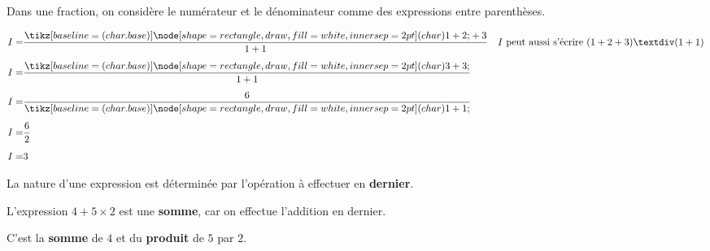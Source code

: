 \documentclass[../€Cours-complet/Cours-complet]{subfiles}
\begin{document}
\begin{cours}
	Dans une fraction, on considère le numérateur et le dénominateur comme des expressions entre parenthèses.
\end{cours}

\begin{exemple}
	\renewcommand{\arraystretch}{1.5}
	\begin{align*}
		I = & \frac{\squared{1 + 2} + 3}{1+1} & I\text{ peut aussi s'écrire }(1+2+3)÷(1+1) \\[0.5em]
		I = & \frac{\squared{3 + 3}}{1+1}     &                                            \\[0.5em]
		I = & \frac{6}{\squared{1+1}   }      &                                            \\[0.5em]
		I = & \frac{6}{2}                     &                                            \\[0.5em]
		I = & 3                               &
	\end{align*}
	\renewcommand{\arraystretch}{1}
\end{exemple}

\begin{cours}
	La nature d'une expression est déterminée par l'opération à effectuer en \textbf{dernier}.
\end{cours}

\begin{exemple}
	L'expression $4 + 5 × 2$ est une \textbf{somme}, car on effectue l'addition en dernier.

	C'est la \textbf{somme} de $4$ et du \textbf{produit} de $5$ par $2$.
\end{exemple}
\end{document}
